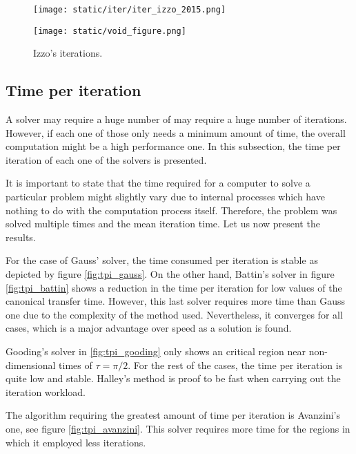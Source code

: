 \begin{figure}[H]
  \begin{minipage}{0.48\textwidth}
    \centering
    \texttt{[image: static/iter/iter\_izzo\_2015.png]}
    \caption{Izzo's iterations.}\label{fig:iter_izzo}
  \end{minipage}\hfill
  \begin{minipage}{0.48\textwidth}
    \centering
    \texttt{[image: static/void\_figure.png]}
  \end{minipage}
\end{figure}

\subsection{Time per iteration}

A solver may require a huge number of may require a huge number of iterations.
However, if each one of those only needs a minimum amount of time, the overall
computation might be a high performance one. In this subsection, the time per
iteration of each one of the solvers is presented.

It is important to state that the time required for a computer to solve a
particular problem might slightly vary due to internal processes which have
nothing to do with the computation process itself. Therefore, the problem was
solved multiple times and the mean iteration time. Let us now present the
results.

For the case of Gauss' solver, the time consumed per iteration is stable as
depicted by figure \ref{fig:tpi_gauss}. On the other hand, Battin's solver in
figure \ref{fig:tpi_battin} shows a reduction in the time per iteration for low
values of the canonical transfer time. However, this last solver requires more
time than Gauss one due to the complexity of the method used. Nevertheless, it
converges for all cases, which is a major advantage over speed as a solution is
found.

Gooding's solver in \ref{fig:tpi_gooding} only shows an critical region near
non-dimensional times of $\tau=\pi/2$. For the rest of the cases, the time per
iteration is quite low and stable. Halley's method is proof to be fast when
carrying out the iteration workload.

The algorithm requiring the greatest amount of time per iteration is Avanzini's
one, see figure \ref{fig:tpi_avanzini}. This solver requires more time for the
regions in which it employed less iterations.

